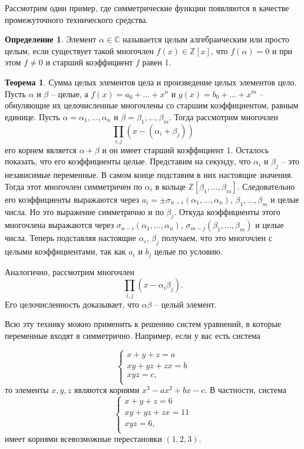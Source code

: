 \documentclass[10pt,a4paper,oneside]{book}
\theoremstyle{definition}
\newtheorem*{defn}{{\color{yellow!30!red} Определение}}
\newtheorem{thm}{{\color{red!40!black} Теорема}}
\newcommand{\mb}[1]{\mathbb{#1}}
\def\thrm{\begin{thm}}
\def\ethrm{\end{thm}}
\def\dfn{\begin{defn}}
\def\edfn{\end{defn}}
\begin{document}
Рассмотрим один пример, где симметрические функции появляются в качестве промежуточного технического средства.

\dfn Элемент $\alpha \in \mb C$ называется целым алгебраическим или просто целым, если существует такой многочлен $f(x)\in \mb Z[x]$, что $f(\alpha)=0$ и при этом $f\neq 0$ и старший коэффициент $f$ равен 1.
\edfn

\thrm Сумма целых элементов цела и произведение целых элементов цело. 
\proof Пусть $\alpha$ и $\beta$ -- целые, а $f(x)=a_0+\dots+x^n$ и $g(x)=b_0+\dots+x^m$ -- обнуляющие их целочисленные многочлены со старшим коэффициентом, равным единице. Пусть $\alpha=\alpha_1,\dots,\alpha_n$ и $\beta=\beta_1,\dots,\beta_m$. Тогда рассмотрим многочлен
$$\prod_{i,j} (x -(\alpha_i+\beta_j))$$
его корнем является $\alpha+\beta$ и он имеет старший коэффициент 1. Осталось показать, что его коэффициенты целые. Представим на секунду, что $\alpha_i$ и $\beta_j$ -- это независимые переменные. В самом конце подставим в них настоящие значения. Тогда этот многочлен симметричен по $\alpha_i$ в кольце $\mb Z[\beta_1,\dots,\beta_m]$. Следовательно его коэффициенты выражаются через $a_i=\pm \sigma_{n-i}(\alpha_1,\dots,\alpha_n)$, $\beta_1,\dots,\beta_m$ и целые числа. Но это выражение симметрично и по $\beta_j$. Откуда коэффициенты этого многочлена выражаются через $\sigma_{n-i}(\alpha_1,\dots,\alpha_n)$,  $\sigma_{m-j}(\beta_1,\dots,\beta_m)$ и целые числа. Теперь подставляя настоящие $\alpha_i$, $\beta_j$ получаем, что это многочлен с целыми коэффициентами, так как $a_i$ и $b_j$ целые по условию.

Аналогично, рассмотрим многочлен 
$$\prod_{i,j} (x-\alpha_i\beta_j).$$
Его целочисленность доказывает, что $\alpha\beta$ -- целый элемент.
\endproof
\ethrm

Всю эту технику можно применить к решению систем уравнений, в которые переменные входят в симметрично. Например, если у вас есть система

$$\begin{cases}
x + y + z = a\\
xy + yz + zx = b\\
xyz = c,\\
\end{cases}$$
то элементы $x,y,z$ являются корнями $x^3-ax^2+bx-c$. В частности, система
$$\begin{cases}
x + y + z = 6\\
xy + yz + zx = 11\\
xyz = 6,\\
\end{cases}$$
имеет корнями всевозможные перестановки $(1,2,3)$.
\end{document}
